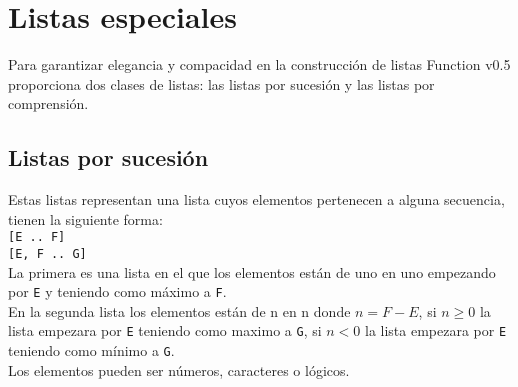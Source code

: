
\titlespacing{\subsection}{0pt}{10pt}{0pt}

\chapter{Listas especiales}
   Para garantizar elegancia y compacidad en la construcción de listas Function v0.5 proporciona dos clases de listas: las listas por sucesión y las listas por comprensión.
   
   \section{Listas por sucesión}
      Estas listas representan una lista cuyos elementos pertenecen a alguna secuencia, tienen la siguiente forma:
      \\
      
      \texttt{[E .. F]}\\
      \texttt{[E, F .. G]}
      \\
      
      La primera es una lista en el que los elementos están de uno en uno empezando por \texttt{E} y teniendo como máximo a \texttt{F}.
      \\
      
      En la segunda lista los elementos están de n en n donde $n = F - E$, si $n \geq 0$ la lista empezara por \texttt{E} teniendo como maximo a \texttt{G}, si $n < 0$ la lista empezara por \texttt{E} teniendo como mínimo a \texttt{G}.
      \\
      
      Los elementos pueden ser números, caracteres o lógicos.
      
      \begin{fxcode}
         \arrowcode{[1 .. 10.3]}\\
         \outcode{[1, 2, 3, 4, 5, 6, 7, 8, 9, 10]}\\
         \\
         \\
         \arrowcode{[1, 3 .. 20]}\\
         \outcode{[1, 3, 5, 7, 9, 11, 13, 15, 17, 19]}\\
         \arrowcode{[1, 0 .. -5]}\\
         \outcode{[1, 0, -1, -2, -3, -4, -5]}\\
         \arrowcode{[7, 7 .. 100]} 
      \end{fxcode}
      
